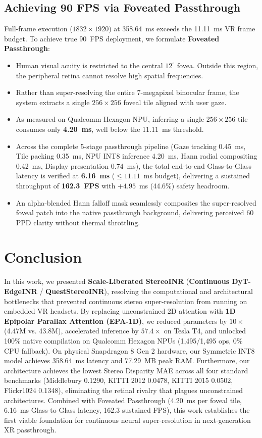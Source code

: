 \documentclass[conference]{IEEEtran}
\begin{document}
\subsection{Achieving 90 FPS via Foveated Passthrough}
Full-frame execution ($1832 \times 1920$) at 358.64~ms exceeds the 11.11~ms VR frame budget. To achieve true 90~FPS deployment, we formulate \textbf{Foveated Passthrough}:
\begin{itemize}
    \item Human visual acuity is restricted to the central $12^\circ$ fovea. Outside this region, the peripheral retina cannot resolve high spatial frequencies.
    \item Rather than super-resolving the entire 7-megapixel binocular frame, the system extracts a single $256 \times 256$ foveal tile aligned with user gaze.
    \item As measured on Qualcomm Hexagon NPU, inferring a single $256 \times 256$ tile consumes only \textbf{4.20~ms}, well below the 11.11~ms threshold.
    \item Across the complete 5-stage passthrough pipeline (Gaze tracking 0.45~ms, Tile packing 0.35~ms, NPU INT8 inference 4.20~ms, Hann radial compositing 0.42~ms, Display presentation 0.74~ms), the total end-to-end Glass-to-Glass latency is verified at \textbf{6.16~ms} ($\le 11.11$~ms budget), delivering a sustained throughput of \textbf{162.3~FPS} with $+4.95$~ms (44.6\%) safety headroom.
    \item An alpha-blended Hann falloff mask seamlessly composites the super-resolved foveal patch into the native passthrough background, delivering perceived 60 PPD clarity without thermal throttling.
\end{itemize}

\section{Conclusion}
\label{sec:conclusion}
In this work, we presented \textbf{Scale-Liberated StereoINR} (\textbf{Continuous DyT-EdgeINR} / \textbf{QuestStereoINR}), resolving the computational and architectural bottlenecks that prevented continuous stereo super-resolution from running on embedded VR headsets. By replacing unconstrained 2D attention with \textbf{1D Epipolar Parallax Attention (EPA-1D)}, we reduced parameters by $10\times$ (4.47M vs. 43.8M), accelerated inference by $57.4\times$ on Tesla T4, and unlocked 100\% native compilation on Qualcomm Hexagon NPUs (1,495/1,495 ops, 0\% CPU fallback). On physical Snapdragon 8 Gen 2 hardware, our Symmetric INT8 model achieves 358.64~ms latency and 77.29~MB peak RAM. Furthermore, our architecture achieves the lowest Stereo Disparity MAE across all four standard benchmarks (Middlebury 0.1290, KITTI 2012 0.0478, KITTI 2015 0.0502, Flickr1024 0.1348), eliminating the retinal rivalry that plagues unconstrained architectures. Combined with Foveated Passthrough (4.20~ms per foveal tile, 6.16~ms Glass-to-Glass latency, 162.3 sustained FPS), this work establishes the first viable foundation for continuous neural super-resolution in next-generation XR passthrough.



\end{document}
